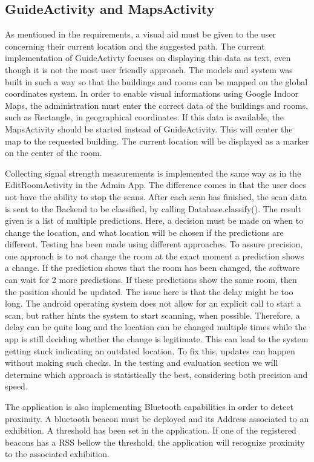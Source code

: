 \subsection{GuideActivity and MapsActivity}
As mentioned in the requirements, a visual aid must be given to the user concerning their current location and the suggested path. The current implementation of GuideActivty focuses on displaying this data as text, even though it is not the most user friendly approach. The models and system was built in such a way so that the buildings and rooms can be mapped on the global coordinates system. In order to enable visual informations using Google Indoor Maps, the administration must enter the correct data of the buildings and rooms, such as Rectangle, in geographical coordinates. If this data is available, the MapsActivity should be started instead of GuideActivity. This will center the map to the requested building. The current location will be displayed as a marker on the center of the room.

Collecting signal strength measurements is implemented the same way as in the EditRoomActivity in the Admin App. The difference comes in that the user does not have the ability to stop the scans. After each scan has finished, the scan data is sent to the Backend to be classified, by calling Database.classify(). The result given is a list of multiple predictions. Here, a decision must be made on when to change the location, and what location will be chosen if the predictions are different. Testing has been made using different approaches. To assure precision, one approach is to not change the room at the exact moment a prediction shows a change. If the prediction shows that the room has been changed, the software can wait for 2 more predictions. If these predictions show the same room, then the position should be updated. The issue here is that the delay might be too long. The android operating system does not allow for an explicit call to start a scan, but rather hints the system to start scanning, when possible. Therefore, a delay can be quite long and the location can be changed multiple times while the app is still deciding whether the change is legitimate. This can lead to the system getting stuck indicating an outdated location. To fix this, updates can happen without making such checks. In the testing and evaluation section we will determine which approach is statistically the best, considering both precision and speed.

The application is also implementing Bluetooth capabilities in order to detect proximity. A bluetooth beacon must be deployed and its Address associated to an exhibition. A threshold has been set in the application. If one of the registered beacons has a RSS bellow the threshold, the application will recognize proximity to the associated exhibition. 

